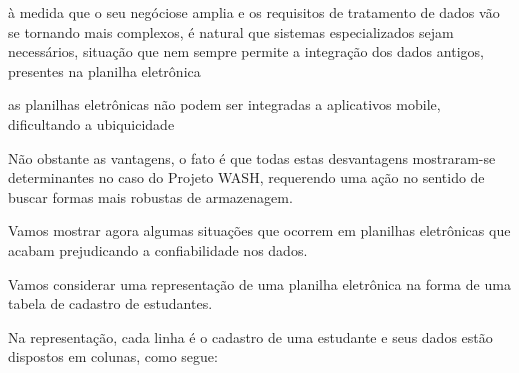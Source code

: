 \documentclass[
12pt,		%
openright,	%
twoside,  %
a4paper,			%
chapter=TITLE,		%
english,			%
french,				%
spanish,			%
brazil				%
]{USPSC-classe/USPSC}
\begin{document}
\begin{alineas}
\item \`a medida que o seu \textquotedbl neg\'ocio\textquotedbl  se amplia e os requisitos de tratamento de dados v\~ao se tornando mais complexos, \'e natural que sistemas especializados sejam necess\'arios, situa\c{c}\~ao que nem sempre permite a integra\c{c}\~ao dos dados antigos, presentes na planilha eletr\^onica
\item as planilhas eletr\^onicas n\~ao podem ser integradas a aplicativos mobile, dificultando a ubiquicidade
\end{alineas}

N\~ao obstante as vantagens, o fato \'e que todas estas desvantagens mostraram-se determinantes no caso do Projeto WASH, requerendo uma a\c{c}\~ao no sentido de buscar formas mais robustas de armazenagem.














Vamos mostrar agora algumas situa\c{c}\~oes que ocorrem em planilhas eletr\^onicas que acabam prejudicando a confiabilidade nos dados.














Vamos considerar uma representa\c{c}\~ao de uma planilha eletr\^onica na forma de uma tabela de cadastro de estudantes.














Na representa\c{c}\~ao, cada linha \'e o cadastro de uma estudante e seus dados est\~ao dispostos em colunas, como segue:
\end{document}
